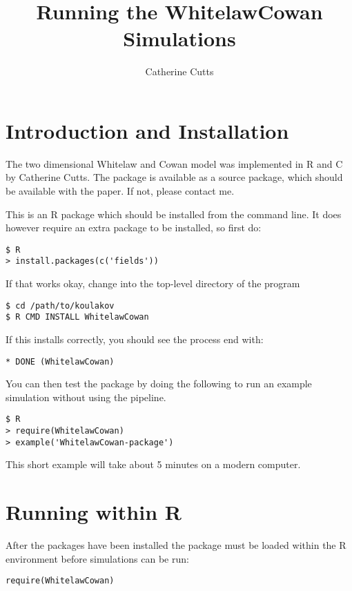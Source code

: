 \documentclass[a4paper,12pt]{article}
\begin{document}
\title{Running the WhitelawCowan Simulations}
\maketitle

\author{Catherine Cutts}
\date

\tableofcontents

\section{Introduction and Installation}
The two dimensional Whitelaw and Cowan model was implemented in R and C by Catherine Cutts. The package is available as a source package, which should be available with the paper. If not, please contact me. 

This is an R package which should be installed from the command line.
It does however require an extra package to be installed, so first do:

\begin{verbatim}
$ R
> install.packages(c('fields'))
\end{verbatim}

If that works okay, change into the top-level directory of the program
\begin{verbatim}
$ cd /path/to/koulakov
$ R CMD INSTALL WhitelawCowan
\end{verbatim}

If this installs correctly, you should see the process end with:

\begin{verbatim}
* DONE (WhitelawCowan)
\end{verbatim}

You can then test the package by doing the following to run an
example simulation without using the pipeline.

\begin{verbatim}
$ R
> require(WhitelawCowan)
> example('WhitelawCowan-package')
\end{verbatim}

This short example will take about 5 minutes on a modern computer.

\section{Running within R}
After the packages have been installed the package must be loaded within the R environment before simulations can be run:

\begin{verbatim}
require(WhitelawCowan)
\end{verbatim}
\end{document}
